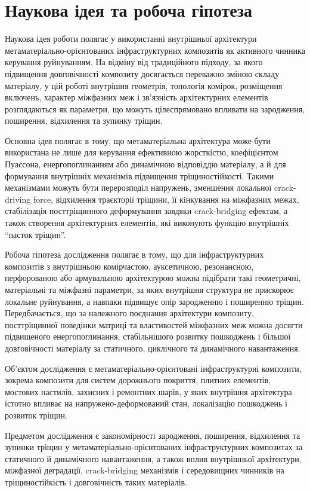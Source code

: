 \documentclass[12pt,a4paper]{article}
\begin{document}
\section{Наукова ідея та робоча гіпотеза}

Наукова ідея роботи полягає у використанні внутрішньої архітектури метаматеріально-орієнтованих інфраструктурних композитів як активного чинника керування руйнуванням. На відміну від традиційного підходу, за якого підвищення довговічності композиту досягається переважно зміною складу матеріалу, у цій роботі внутрішня геометрія, топологія комірок, розміщення включень, характер міжфазних меж і зв'язність архітектурних елементів розглядаються як параметри, що можуть цілеспрямовано впливати на зародження, поширення, відхилення та зупинку тріщин.

Основна ідея полягає в тому, що метаматеріальна архітектура може бути використана не лише для керування ефективною жорсткістю, коефіцієнтом Пуассона, енергопоглинанням або динамічною відповіддю матеріалу, а й для формування внутрішніх механізмів підвищення тріщиностійкості. Такими механізмами можуть бути перерозподіл напружень, зменшення локальної crack-driving force, відхилення траєкторії тріщини, її кiнкування на міжфазних межах, стабілізація посттріщинного деформування завдяки crack-bridging ефектам, а також створення архітектурних елементів, які виконують функцію внутрішніх ``пасток тріщин''.

Робоча гіпотеза дослідження полягає в тому, що для інфраструктурних композитів з внутрішньою комірчастою, ауксетичною, резонансною, перфорованою або армувальною архітектурою можна підібрати такі геометричні, матеріальні та міжфазні параметри, за яких внутрішня структура не прискорює локальне руйнування, а навпаки підвищує опір зародженню і поширенню тріщин. Передбачається, що за належного поєднання архітектури композиту, посттріщинної поведінки матриці та властивостей міжфазних меж можна досягти підвищеного енергопоглинання, стабільнішого розвитку пошкоджень і більшої довговічності матеріалу за статичного, циклічного та динамічного навантаження.

Об'єктом дослідження є метаматеріально-орієнтовані інфраструктурні композити, зокрема композити для систем дорожнього покриття, плитних елементів, мостових настилів, захисних і ремонтних шарів, у яких внутрішня архітектура істотно впливає на напружено-деформований стан, локалізацію пошкоджень і розвиток тріщин.

Предметом дослідження є закономірності зародження, поширення, відхилення та зупинки тріщин у метаматеріально-орієнтованих інфраструктурних композитах за статичного й динамічного навантаження, а також вплив внутрішньої архітектури, міжфазної деградації, crack-bridging механізмів і середовищних чинників на тріщиностійкість і довговічність таких матеріалів.
\end{document}
